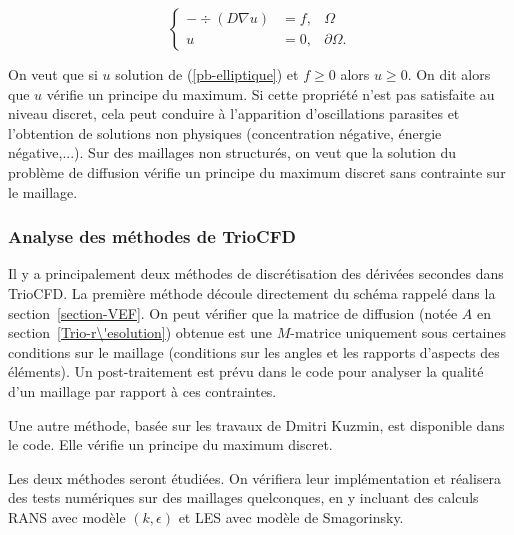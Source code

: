 \begin{equation}
\label{pb-elliptique}
\left\lbrace
\begin{array}{rcl}
-\div \left( D\nabla u\right) &= f, & \Omega \\
u&=0,& \partial\Omega.
\end{array}\right.
\end{equation}

On veut que si $u$ solution de (\ref{pb-elliptique}) et $f\geq 0$ alors $u\geq 0$. On dit alors que $u$ v\'erifie un principe du maximum. Si cette propri\'et\'e n'est pas satisfaite au niveau discret, cela peut conduire \`a l'apparition d'oscillations parasites et l'obtention de solutions non physiques (concentration n\'egative, \'energie n\'egative,...). Sur des maillages non structur\'es, on veut que la solution du probl\`eme de diffusion v\'erifie un principe du maximum discret sans contrainte sur le maillage.  


\subsubsection{Analyse des m\'ethodes de TrioCFD}
\label{section-diffusion-Trio}
Il y a principalement deux m\'ethodes de discr\'etisation des d\'eriv\'ees secondes dans TrioCFD. La premi\`ere m\'ethode d\'ecoule directement du sch\'ema rappel\'e dans la section~\ref{section-VEF}. On peut v\'erifier que la matrice de diffusion (not\'ee $A$ en section~\ref{Trio-r\'esolution}) obtenue est une $M$-matrice uniquement sous certaines conditions sur le maillage (conditions sur les angles  et les rapports d'aspects des \'el\'ements). Un post-traitement est pr\'evu dans le code pour analyser la qualit\'e d'un maillage par rapport \`a ces contraintes.
 
Une autre m\'ethode, bas\'ee sur les travaux de Dmitri Kuzmin, est disponible dans le code. Elle v\'erifie un principe du maximum discret.

Les deux m\'ethodes seront \'etudi\'ees. On v\'erifiera leur impl\'ementation et r\'ealisera des tests num\'eriques sur des maillages quelconques, en y incluant des calculs RANS avec mod\`ele $(k,\epsilon)$ et LES avec mod\`ele de Smagorinsky. 


